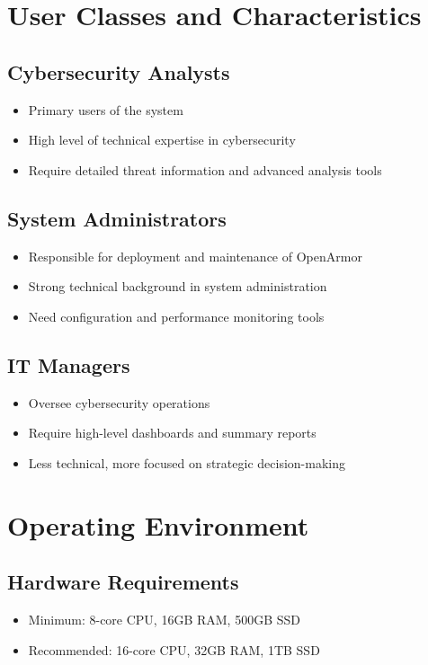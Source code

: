 \section{User Classes and Characteristics}
\subsection{Cybersecurity Analysts}
\begin{itemize}
    \item Primary users of the system
    \item High level of technical expertise in cybersecurity
    \item Require detailed threat information and advanced analysis tools
\end{itemize}

\subsection{System Administrators}
\begin{itemize}
    \item Responsible for deployment and maintenance of OpenArmor
    \item Strong technical background in system administration
    \item Need configuration and performance monitoring tools
\end{itemize}

\subsection{IT Managers}
\begin{itemize}
    \item Oversee cybersecurity operations
    \item Require high-level dashboards and summary reports
    \item Less technical, more focused on strategic decision-making
\end{itemize}

\section{Operating Environment}
\subsection{Hardware Requirements}
\begin{itemize}
    \item Minimum: 8-core CPU, 16GB RAM, 500GB SSD
    \item Recommended: 16-core CPU, 32GB RAM, 1TB SSD
\end{itemize}

